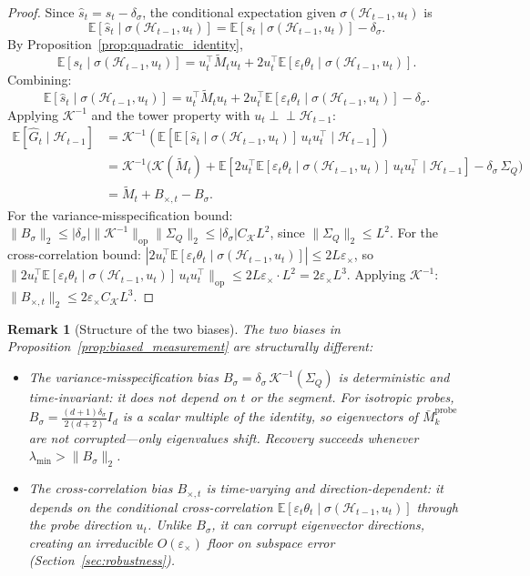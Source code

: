 \documentclass[12pt]{article}
\newcommand{\E}{\mathbb{E}}
\newcommand{\op}{\mathrm{op}}
\newcommand{\cH}{\mathcal{H}}
\newtheorem{remark}{Remark}
\theoremstyle{plain}
\theoremstyle{definition}
\begin{document}
\begin{proof}
Since $\hat{s}_t = s_t - \delta_\sigma$, the conditional expectation given $\sigma(\cH_{t-1}, u_t)$ is
\[
\E[\hat{s}_t \mid \sigma(\cH_{t-1}, u_t)]
= \E[s_t \mid \sigma(\cH_{t-1}, u_t)] - \delta_\sigma.
\]
By Proposition~\ref{prop:quadratic_identity},
\[
\E[s_t \mid \sigma(\cH_{t-1}, u_t)]
= u_t^\top \widetilde{M}_t u_t + 2u_t^\top \E[\varepsilon_t \theta_t \mid \sigma(\cH_{t-1}, u_t)].
\]
Combining:
\[
\E[\hat{s}_t \mid \sigma(\cH_{t-1}, u_t)]
= u_t^\top \widetilde{M}_t u_t
+ 2u_t^\top \E[\varepsilon_t \theta_t \mid \sigma(\cH_{t-1}, u_t)]
- \delta_\sigma.
\]
Applying $\mathcal{K}^{-1}$ and the tower property with $u_t \perp\!\!\!\perp \cH_{t-1}$:
\begin{align*}
\E[\hat{G}_t \mid \cH_{t-1}]
&= \mathcal{K}^{-1}\!\left(
\E\!\left[
\E[\hat{s}_t \mid \sigma(\cH_{t-1}, u_t)]\, u_t u_t^\top
\mid \cH_{t-1}
\right]
\right) \\
&= \mathcal{K}^{-1}\!\big(
\mathcal{K}(\widetilde{M}_t)
+ \E[2u_t^\top \E[\varepsilon_t \theta_t \mid \sigma(\cH_{t-1}, u_t)]\, u_t u_t^\top \mid \cH_{t-1}]
- \delta_\sigma\, \Sigma_Q
\big) \\
&= \widetilde{M}_t + B_{\times,t} - B_\sigma.
\end{align*}
For the variance-misspecification bound: $\|B_\sigma\|_2 \le |\delta_\sigma| \|\mathcal{K}^{-1}\|_{\op} \|\Sigma_Q\|_2 \le |\delta_\sigma| C_{\mathcal{K}} L^2$, since $\|\Sigma_Q\|_2 \le L^2$.
For the cross-correlation bound: $|2u_t^\top \E[\varepsilon_t \theta_t \mid \sigma(\cH_{t-1}, u_t)]| \le 2L\varepsilon_\times$, so
$\|2u_t^\top \E[\varepsilon_t \theta_t \mid \sigma(\cH_{t-1}, u_t)]\, u_t u_t^\top\|_{\op} \le 2L\varepsilon_\times \cdot L^2 = 2\varepsilon_\times L^3$.
Applying $\mathcal{K}^{-1}$: $\|B_{\times,t}\|_2 \le 2\varepsilon_\times C_{\mathcal{K}} L^3$.
\end{proof}

\begin{remark}[Structure of the two biases]
\label{rem:bias_structure}
The two biases in Proposition~\ref{prop:biased_measurement} are structurally different:
\begin{itemize}[nosep]
\item The variance-misspecification bias $B_\sigma = \delta_\sigma\, \mathcal{K}^{-1}(\Sigma_Q)$ is \emph{deterministic} and \emph{time-invariant}: it does not depend on $t$ or the segment. For isotropic probes, $B_\sigma = \frac{(d+1)\delta_\sigma}{2(d+2)} I_d$ is a scalar multiple of the identity, so eigenvectors of $\bar{M}_k^{\mathrm{probe}}$ are not corrupted---only eigenvalues shift. Recovery succeeds whenever $\lambda_{\min} > \|B_\sigma\|_2$.
\item The cross-correlation bias $B_{\times,t}$ is \emph{time-varying} and \emph{direction-dependent}: it depends on the conditional cross-correlation $\E[\varepsilon_t \theta_t \mid \sigma(\cH_{t-1}, u_t)]$ through the probe direction $u_t$. Unlike $B_\sigma$, it can corrupt eigenvector directions, creating an irreducible $O(\varepsilon_\times)$ floor on subspace error (Section~\ref{sec:robustness}).
\end{itemize}
\end{remark}
\end{document}

